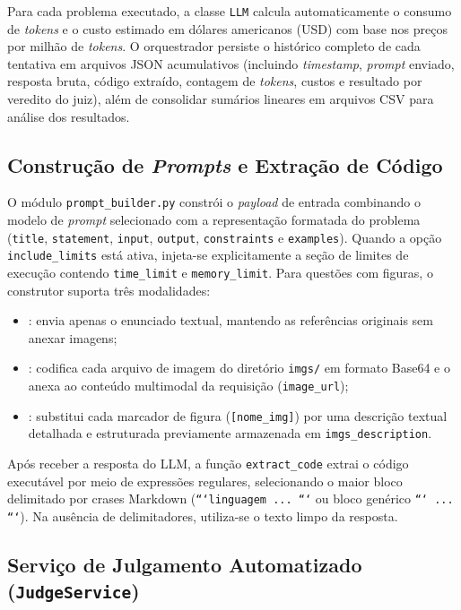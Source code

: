 Para cada problema executado, a classe \texttt{LLM} calcula automaticamente o consumo de \textit{tokens} e o custo estimado em dólares americanos (USD) com base nos preços por milhão de \textit{tokens}. O orquestrador persiste o histórico completo de cada tentativa em arquivos JSON acumulativos (incluindo \textit{timestamp}, \textit{prompt} enviado, resposta bruta, código extraído, contagem de \textit{tokens}, custos e resultado por veredito do juiz), além de consolidar sumários lineares em arquivos CSV para análise dos resultados.

\subsection{Construção de \textit{Prompts} e Extração de Código}\label{sec:met-prompt-builder}

O módulo \texttt{prompt\_builder.py} constrói o \textit{payload} de entrada combinando o modelo de \textit{prompt} selecionado com a representação formatada do problema (\texttt{title}, \texttt{statement}, \texttt{input}, \texttt{output}, \texttt{constraints} e \texttt{examples}). Quando a opção \texttt{include\_limits} está ativa, injeta-se explicitamente a seção de limites de execução contendo \texttt{time\_limit} e \texttt{memory\_limit}. Para questões com figuras, o construtor suporta três modalidades:
\begin{itemize}
    \item {}: envia apenas o enunciado textual, mantendo as referências originais sem anexar imagens;
    \item {}: codifica cada arquivo de imagem do diretório \texttt{imgs/} em formato Base64 e o anexa ao conteúdo multimodal da requisição (\texttt{image\_url});
    \item {}: substitui cada marcador de figura (\texttt{[nome\_img]}) por uma descrição textual detalhada e estruturada previamente armazenada em \texttt{imgs\_description}.
\end{itemize}

Após receber a resposta do LLM, a função \texttt{extract\_code} extrai o código executável por meio de expressões regulares, selecionando o maior bloco delimitado por crases Markdown (\texttt{```linguagem ... ```} ou bloco genérico \texttt{``` ... ```}). Na ausência de delimitadores, utiliza-se o texto limpo da resposta.

\subsection{Serviço de Julgamento Automatizado (\texttt{JudgeService})}\label{sec:met-judge}

